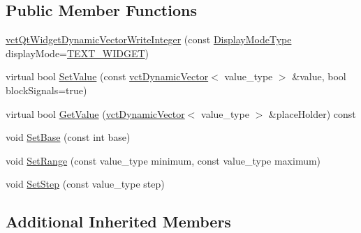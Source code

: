 \subsection*{Public Member Functions}
\begin{DoxyCompactItemize}
\item 
\hyperlink{classvct_qt_widget_dynamic_vector_write_integer_a384efbb51ef827c4995cbdd658069d71}{vct\-Qt\-Widget\-Dynamic\-Vector\-Write\-Integer} (const \hyperlink{classvct_qt_widget_dynamic_vector_write_base_aefbf6a51f1009f060305c2b5e106cf02}{Display\-Mode\-Type} display\-Mode=\hyperlink{classvct_qt_widget_dynamic_vector_write_base_aefbf6a51f1009f060305c2b5e106cf02aa84e1bae39afe989e862b07258d0889e}{T\-E\-X\-T\-\_\-\-W\-I\-D\-G\-E\-T})
\item 
virtual bool \hyperlink{classvct_qt_widget_dynamic_vector_write_integer_a1c2964bde86c1309e05fc8ebe3aadaf8}{Set\-Value} (const \hyperlink{classvct_dynamic_vector}{vct\-Dynamic\-Vector}$<$ value\-\_\-type $>$ \&value, bool block\-Signals=true)
\item 
virtual bool \hyperlink{classvct_qt_widget_dynamic_vector_write_integer_a8d4e00ee7e60c90afa1c501178363205}{Get\-Value} (\hyperlink{classvct_dynamic_vector}{vct\-Dynamic\-Vector}$<$ value\-\_\-type $>$ \&place\-Holder) const 
\item 
void \hyperlink{classvct_qt_widget_dynamic_vector_write_integer_a17834a29210aa8ba00c13866eb783257}{Set\-Base} (const int base)
\item 
void \hyperlink{classvct_qt_widget_dynamic_vector_write_integer_adbf25055074769c268162eda7b909d53}{Set\-Range} (const value\-\_\-type minimum, const value\-\_\-type maximum)
\item 
void \hyperlink{classvct_qt_widget_dynamic_vector_write_integer_a22ed60e31043a338f82e07cb7fba5aee}{Set\-Step} (const value\-\_\-type step)
\end{DoxyCompactItemize}
\subsection*{Additional Inherited Members}


